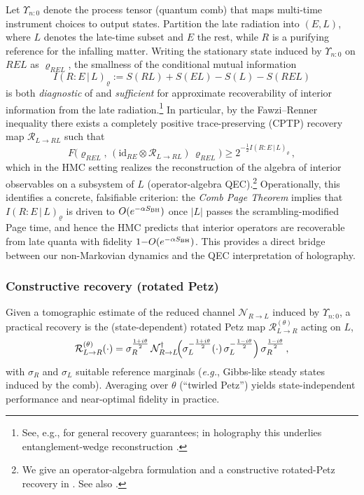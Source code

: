 \documentclass[11pt,a4paper]{article}
\newcommand{\eg}{\textit{e.g.}\xspace}
\newcommand{\HMC}{\textsc{HMC}\xspace}
\theoremstyle{plain}
\theoremstyle{definition}
\theoremstyle{remark}
\begin{document}
Let $\Upsilon_{n{:}0}$ denote the process tensor (quantum comb) that maps multi-time instrument choices to output states. Partition the late radiation into $(E,L)$, where $L$ denotes the late-time subset and $E$ the rest, while $R$ is a purifying reference for the infalling matter.
Writing the stationary state induced by $\Upsilon_{n{:}0}$ on $REL$ as $\varrho_{REL}$, the smallness of the conditional mutual information
\begin{equation}
I(R{:}E\,|\,L)_{\varrho} := S(RL) + S(EL) - S(L) - S(REL)
\end{equation}
is both \emph{diagnostic} of and \emph{sufficient} for approximate recoverability of interior information from the late radiation.\footnote{See, e.g., \cite{FawziRenner:2015} for general recovery guarantees; in holography this underlies entanglement-wedge reconstruction \cite{ADH:2015}.}
In particular, by the Fawzi--Renner inequality there exists a completely positive trace-preserving (CPTP) recovery map $\mathcal{R}_{L\to RL}$ such that
\begin{equation}
F\bigl(\varrho_{REL},\, (\mathrm{id}_{RE}\otimes \mathcal{R}_{L\to RL})\,\varrho_{REL}\bigr) \geq 2^{-\tfrac12 I(R{:}E\,|\,L)_{\varrho}}\,,
\end{equation}
which in the \HMC{} setting realizes the reconstruction of the algebra of interior observables on a subsystem of $L$ (operator-algebra QEC).\footnote{We give an operator-algebra formulation and a constructive rotated-Petz recovery in . See also \cite{Petz:1986,ADH:2015,Pastawski:2015}.}
Operationally, this identifies a concrete, falsifiable criterion: the \emph{Comb Page Theorem} implies that $I(R{:}E\,|\,L)_{\varrho}$ is driven to $O(e^{-\alpha S_{\rm BH}})$ once $|L|$ passes the scrambling-modified Page time, and hence the \HMC{} predicts that interior operators are recoverable from late quanta with fidelity $1{-}O(e^{-\alpha S_{\rm BH}})$.
This provides a direct bridge between our non-Markovian dynamics and the QEC interpretation of holography.

\subsubsection{Constructive recovery (rotated Petz)}
Given a tomographic estimate of the reduced channel $\mathcal{N}_{R\to L}$ induced by $\Upsilon_{n{:}0}$, a practical recovery is the (state-dependent) rotated Petz map $\mathcal{R}^{(\theta)}_{L\to R}$ acting on $L$,
\begin{equation}
\mathcal{R}^{(\theta)}_{L\to R}(\cdot) = \sigma_R^{\frac{1+i\theta}{2}}\, \mathcal{N}_{R\to L}^{\dagger}\!\Bigl(\sigma_L^{-\frac{1+i\theta}{2}}(\cdot)\,\sigma_L^{-\frac{1-i\theta}{2}}\Bigr)\,\sigma_R^{\frac{1-i\theta}{2}}\,,
\end{equation}
with $\sigma_R$ and $\sigma_L$ suitable reference marginals (\eg, Gibbs-like steady states induced by the comb).
Averaging over $\theta$ (``twirled Petz'') yields state-independent performance and near-optimal fidelity in practice.
\end{document}
